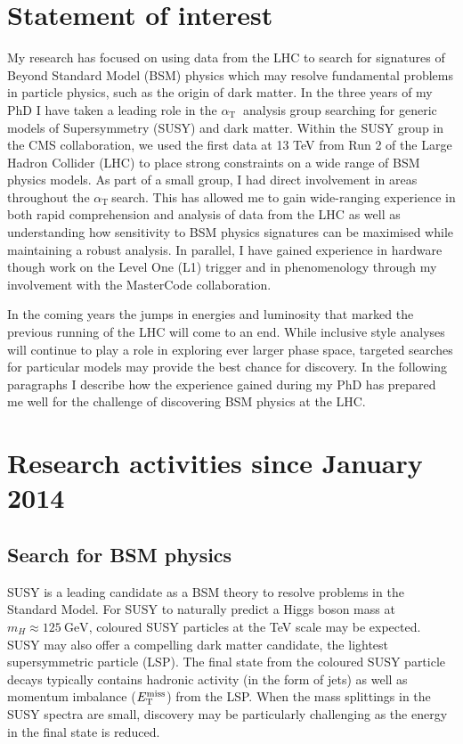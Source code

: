 \documentclass[11pt]{article}
\theoremstyle{plain} \numberwithin{equation}{section}
\theoremstyle{definition}
\DeclareRobustCommand{\alphat}{$\alpha_{\text{T}}~$}
\DeclareRobustCommand{\met}{$\mbox{$E_\text{T}^{\rm miss}$}\xspace$}
\begin{document}
\section*{Statement of interest}
\noindent 
My research has focused on using data from the LHC to search for signatures of Beyond Standard Model (BSM) physics which may resolve 
fundamental problems in particle physics, such as the origin of dark matter. 
In the three years of my PhD I have taken a leading role in the \alphat 
analysis group searching for generic models of Supersymmetry (SUSY) and dark matter. 
Within the SUSY group in the CMS collaboration, we used the first data at 13 TeV from Run 2 of the 
Large Hadron Collider (LHC) to place strong constraints on a wide range of BSM physics models. 
As part of a small group, I had direct involvement in areas throughout the \alphat search. 
This has allowed me to gain wide-ranging experience in both rapid comprehension
and analysis of data from the LHC as well as understanding how sensitivity to BSM physics signatures can be maximised
while maintaining a robust analysis. In parallel, I have gained experience in hardware though work on the 
Level One (L1) trigger and in phenomenology through my involvement with the MasterCode collaboration.

In the coming years the jumps in energies and luminosity that marked the previous running of the 
LHC will come to an end. While inclusive style analyses will continue to play a role in 
exploring ever larger phase space, targeted searches for particular models 
may provide the best chance for discovery. In the following paragraphs I describe how the experience 
gained during my PhD has prepared me well for the challenge of discovering BSM physics at the LHC.

\section*{Research activities since January 2014}

\subsection*{Search for BSM physics}

SUSY is a leading candidate as a BSM theory to resolve problems in the Standard Model.
For SUSY to naturally predict a Higgs boson mass at $m_H \approx 125~\text{GeV}$, coloured 
SUSY particles at the TeV scale may be expected. SUSY may also offer a compelling dark matter
candidate, the lightest supersymmetric particle (LSP). The final state from the coloured SUSY 
particle decays typically contains hadronic activity (in the form of jets) as well as momentum 
imbalance (\met) from the LSP. When the mass splittings in the SUSY spectra are small, 
discovery may be particularly challenging as the energy in the final state is reduced.
\end{document}
